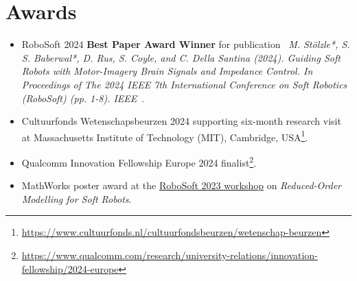 \section*{Awards}
\begin{itemize}
    \item[\faTrophy] RoboSoft 2024 \textbf{Best Paper Award Winner} for publication \faFileTextO \ \emph{M. Stölzle*, S. S. Baberwal*, D. Rus, S. Coyle, and C. Della Santina (2024). Guiding Soft Robots with Motor-Imagery Brain Signals and Impedance Control. In Proceedings of The 2024 IEEE 7th International Conference on Soft Robotics (RoboSoft) (pp. 1-8). IEEE}~\citep{stolzle2024guiding}.
    \item[\faTrophy] Cultuurfonds Wetenschapsbeurzen 2024 supporting six-month research visit at Massachusetts Institute of Technology (MIT), Cambridge, USA\footnote{\url{https://www.cultuurfonds.nl/cultuurfondsbeurzen/wetenschap-beurzen}}.
    \item[\faTrophy] Qualcomm Innovation Fellowship Europe 2024 finalist\footnote{\url{https://www.qualcomm.com/research/university-relations/innovation-fellowship/2024-europe}}.
    \item[\faTrophy] MathWorks poster award at the \href{https://sites.google.com/view/robosoft2023-workshop-rom/home}{RoboSoft 2023 workshop} on \emph{Reduced-Order Modelling for Soft Robots}.
\end{itemize}

